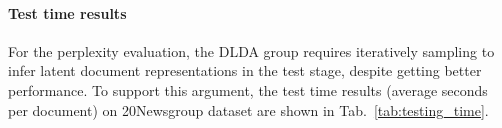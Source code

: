 \documentclass{article}
\begin{document}
\paragraph{Test time results}
For the perplexity evaluation, the DLDA group requires iteratively sampling to infer latent document representations in the test stage, despite getting better performance. To support this argument, the test time results (average seconds per document) on 20Newsgroup dataset are shown in Tab.~\ref{tab:testing_time}. 
\begin{table}
    \centering
    \caption{\small Comparison of testing time.}
    \label{tab:testing_time}
\end{table}
\end{document}
